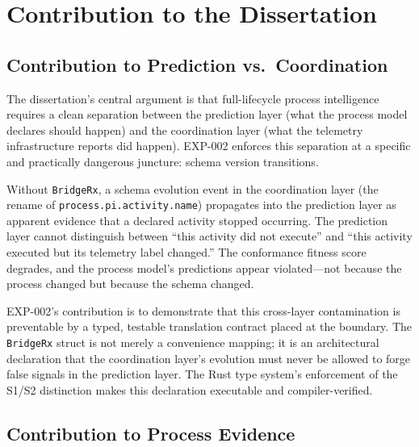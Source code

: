 
\section{Contribution to the Dissertation}
\label{sec:otel-weaver-exp-002-diff-to-residual-contribution}

\subsection{Contribution to Prediction vs.~Coordination}
\label{sec:otel-weaver-exp-002-diff-to-residual-contribution-prediction}

The dissertation's central argument is that full-lifecycle process intelligence
requires a clean separation between the prediction layer (what the process model
declares should happen) and the coordination layer (what the telemetry infrastructure
reports did happen). EXP-002 enforces this separation at a specific and practically
dangerous juncture: schema version transitions.

Without \texttt{BridgeRx}, a schema evolution event in the coordination layer
(the rename of \texttt{process.pi.activity.name}) propagates into the prediction
layer as apparent evidence that a declared activity stopped occurring. The prediction
layer cannot distinguish between ``this activity did not execute'' and ``this activity
executed but its telemetry label changed.'' The conformance fitness score degrades,
and the process model's predictions appear violated---not because the process changed
but because the schema changed.

EXP-002's contribution is to demonstrate that this cross-layer contamination is
preventable by a typed, testable translation contract placed at the boundary. The
\texttt{BridgeRx} struct is not merely a convenience mapping; it is an architectural
declaration that the coordination layer's evolution must never be allowed to forge
false signals in the prediction layer. The Rust type system's enforcement of the
S1/S2 distinction makes this declaration executable and compiler-verified.

\subsection{Contribution to Process Evidence}
\label{sec:otel-weaver-exp-002-diff-to-residual-contribution-evidence}

